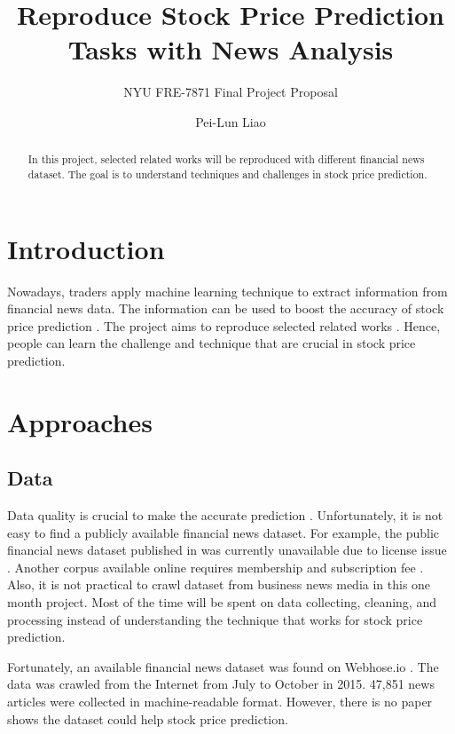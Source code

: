 \documentclass[sigconf]{acmart}
\begin{document}
\title{Reproduce Stock Price Prediction Tasks with News Analysis}
\subtitle{NYU FRE-7871 Final Project Proposal}

\author{Pei-Lun Liao}

\begin{abstract}
In this project, selected related works will be reproduced with different financial news dataset. The goal is to understand techniques and challenges in stock price prediction.
\end{abstract}
\maketitle

\section{Introduction}
Nowadays, traders apply machine learning technique to extract information from financial news data. The information can be used to boost the accuracy of stock price
prediction \cite{AZFinText, Ding2014, Ding2015}. The project aims to reproduce selected related works \cite{AZFinText}. Hence, people can learn the challenge and technique
that are crucial in stock price prediction.

\section{Approaches}
\subsection{Data}
Data quality is crucial to make the accurate prediction \cite{stanford}. Unfortunately, it is not easy to find a publicly available financial news dataset. For example, the public financial
news dataset published in \cite{Ding2014} was currently unavailable due to license issue \cite{fn}. Another corpus available online requires membership and subscription fee \cite{nyt}.
Also, it is not practical to crawl dataset from business news media in this one month project. Most of the time will be spent on data collecting, cleaning, and processing instead of
understanding the technique that works for stock price prediction.

Fortunately, an available financial news dataset was found on Webhose.io \cite{data}. The data was crawled from the Internet from July to October in 2015. 47,851 news articles were collected
in machine-readable format. However, there is no paper shows the dataset could help stock price prediction.
\end{document}
